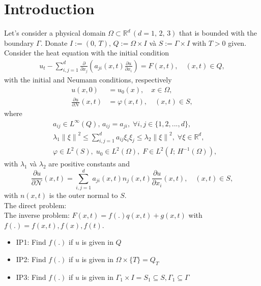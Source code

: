 \documentclass[]{article}
\begin{document}
\justifying

\thispagestyle{empty}
	
\newpage
\section{Introduction}
Let's consider a physical domain $\Omega \subset \mathbb{R}^d\,(d=1,\, 2,\, 3)$ that is bounded with the boundary $\Gamma$. Donate $I:=(0,\, T),\, Q:=\Omega\times I$ và $ S:=\Gamma \times I$ with $T>0$ given. 
\\
Consider the heat equation with the initial condition
\begin{align}
	u_t-\sum_{i, j=1}^{d}\frac{\partial}{\partial x_j}\left(a_{ji}(x, t)\frac{\partial u}{\partial x_i}\right)=F(x, t), \quad(x, t)\in Q,\label{1.1}
\end{align}
with the initial and Neumann conditions, respectively
\begin{align}
	u(x, 0)&=u_0(x),\quad x\in \Omega,\label{1.2}\\
	\frac{\partial u}{\partial \mathcal{N}}(x, t)&=\varphi(x, t),\quad(x, t)\in S,\label{1.3}
\end{align}
where
\begin{align*}
	&a_{ij}\in L^{\infty}(Q),\, a_{ij}=a_{ji},\; \forall i, j\in \{1, 2, ..., d\},\\
	&\lambda_1\left\|\xi\right\|^2\leq \sum_{i, j=1}^{d}a_{ij}\xi_i\xi_j\leq \lambda_2\left\|\xi\right\|^2,\; \forall \xi\in\mathbb{R}^d,\\
	&\varphi\in L^2(S),\; u_0\in L^2(\Omega),\; F\in L^2(I;\, H^{-1}(\Omega)),
\end{align*}
with $\lambda_1$ và $\lambda_2$ are positive constants and 
$$\frac{\partial u}{\partial \mathcal{N}}(x, t)=\sum_{i, j=1}^d a_{ji}(x, t)n_j(x, t)\frac{\partial u}{\partial x_i}(x, t),\quad (x, t)\in S,$$
with $n(x, t)$ is the outer normal to $S$.
\\
The direct problem: 
\\
The inverse problem: $F(x, t) = f(.) q(x, t) + g(x, t)$ with $f(.)=f(x, t), f(x), f(t)$.
\begin{itemize}
	\item IP1: Find $f(.)$ if $u$ is given in $Q$
	\item IP2: Find $f(.)$ if $u$ is given in $\Omega\times \{T\}=Q_T$
	\item IP3: Find $f(.)$ if $u$ is given in $\Gamma_1\times I =S_1\subseteq S, \Gamma_1\subseteq \Gamma$
\end{itemize}
\end{document}
